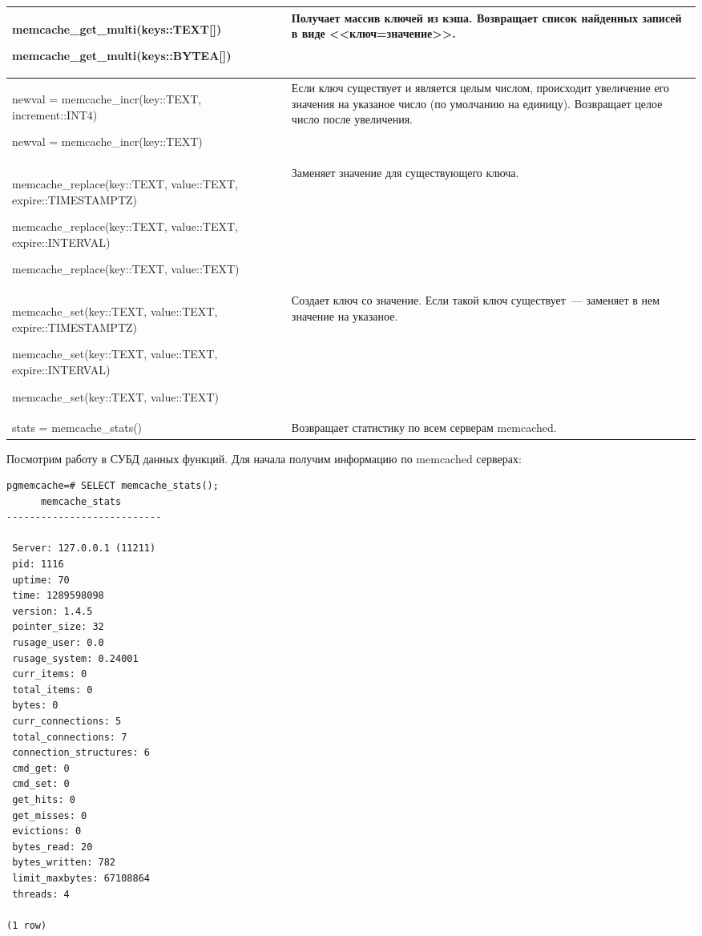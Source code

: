 \begin{table}[h]
\begin{tabular}{| >{\raggedright\scriptsize}p{7cm}| >{\scriptsize}p{7cm} |}
memcache\_get\_multi(keys::TEXT[])

memcache\_get\_multi(keys::BYTEA[])

&
Получает массив ключей из кэша.
Возвращает список найденных записей в виде <<ключ=значение>>.\\

\hline

newval = memcache\_incr(key::TEXT, increment::INT4)

newval = memcache\_incr(key::TEXT)

&
Если ключ существует и является целым числом, происходит увеличение
его значения на указаное число (по умолчанию на единицу).
Возвращает целое число после увеличения.\\

\hline

memcache\_replace(key::TEXT, value::TEXT, expire::TIMESTAMPTZ)

memcache\_replace(key::TEXT, value::TEXT, expire::INTERVAL)

memcache\_replace(key::TEXT, value::TEXT)

&
Заменяет значение для существующего ключа.\\

\hline

memcache\_set(key::TEXT, value::TEXT, expire::TIMESTAMPTZ)

memcache\_set(key::TEXT, value::TEXT, expire::INTERVAL)

memcache\_set(key::TEXT, value::TEXT)

&
Создает ключ со значение. Если такой ключ существует~--- заменяет в нем значение на указаное.\\

\hline

stats = memcache\_stats()

&
Возвращает статистику по всем серверам memcached.\\

\hline
\end{tabular}
\end{table}

Посмотрим работу в СУБД данных функций. Для начала получим информацию по memcached серверах:

\begin{lstlisting}[label=lst:pgcache8,caption=Проверка memcache\_stats]
pgmemcache=# SELECT memcache_stats();
      memcache_stats
---------------------------

 Server: 127.0.0.1 (11211)
 pid: 1116
 uptime: 70
 time: 1289598098
 version: 1.4.5
 pointer_size: 32
 rusage_user: 0.0
 rusage_system: 0.24001
 curr_items: 0
 total_items: 0
 bytes: 0
 curr_connections: 5
 total_connections: 7
 connection_structures: 6
 cmd_get: 0
 cmd_set: 0
 get_hits: 0
 get_misses: 0
 evictions: 0
 bytes_read: 20
 bytes_written: 782
 limit_maxbytes: 67108864
 threads: 4

(1 row)
\end{lstlisting}

